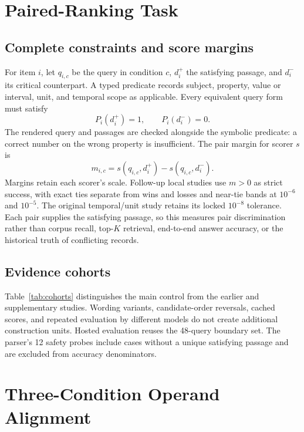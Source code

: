 \documentclass[conference,letterpaper]{IEEEtran}
\begin{document}
\section{Paired-Ranking Task}
\subsection{Complete constraints and score margins}
For item $i$, let $q_{i,c}$ be the query in condition $c$, $d_i^+$ the satisfying passage, and $d_i^-$ its critical counterpart. A typed predicate records subject, property, value or interval, unit, and temporal scope as applicable. Every equivalent query form must satisfy
\begin{equation}
 P_i(d_i^+)=1,\qquad P_i(d_i^-)=0.
\end{equation}
The rendered query and passages are checked alongside the symbolic predicate: a correct number on the wrong property is insufficient. The pair margin for scorer $s$ is
\begin{equation}
 m_{i,c}=s(q_{i,c},d_i^+)-s(q_{i,c},d_i^-).
\end{equation}
Margins retain each scorer's scale. Follow-up local studies use $m>0$ as strict success, with exact ties separate from wins and losses and near-tie bands at $10^{-6}$ and $10^{-5}$. The original temporal/unit study retains its locked $10^{-8}$ tolerance. Each pair supplies the satisfying passage, so this measures pair discrimination rather than corpus recall, top-$K$ retrieval, end-to-end answer accuracy, or the historical truth of conflicting records.

\subsection{Evidence cohorts}
Table~\ref{tab:cohorts} distinguishes the main control from the earlier and supplementary studies. Wording variants, candidate-order reversals, cached scores, and repeated evaluation by different models do not create additional construction units. Hosted evaluation reuses the 48-query boundary set. The parser's 12 safety probes include cases without a unique satisfying passage and are excluded from accuracy denominators.





\section{Three-Condition Operand Alignment}\label{sec:align-design}
\end{document}
